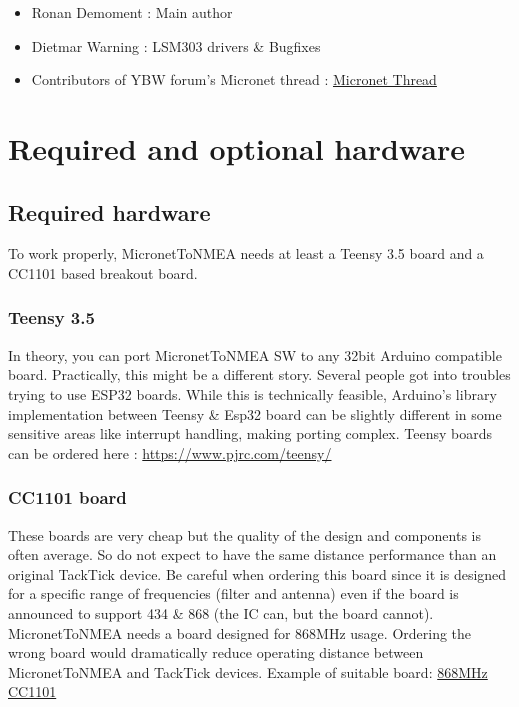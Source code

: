 \documentclass{report}
\begin{document}
\begin{itemize}
\item  Ronan Demoment : Main author
\item Dietmar Warning : LSM303 drivers \& Bugfixes
\item Contributors of YBW forum's Micronet thread : \href{https://forums.ybw.com/index.php?threads/raymarines-micronet.539500/}{Micronet Thread}
\end{itemize}

\chapter{Required and optional hardware}

\section{Required hardware}

To work properly, MicronetToNMEA needs at least a Teensy 3.5 board and a CC1101 based breakout board.

\subsection{Teensy 3.5}
In theory, you can port MicronetToNMEA SW to any 32bit Arduino compatible board. Practically, this might be a different story. Several people got into troubles trying to use ESP32 boards. While this is technically feasible, Arduino's library implementation between Teensy \& Esp32 board can be slightly different in some sensitive areas like interrupt handling, making porting complex.
Teensy boards can be ordered here : \url{https://www.pjrc.com/teensy/}

\subsection{CC1101 board}

These boards are very cheap but the quality of the design and components is often average. So do not expect to have the same distance performance than an original TackTick device. Be careful when ordering this board since it is designed for a specific range of frequencies (filter and antenna) even if the board is announced to support 434 \& 868 (the IC can, but the board cannot). MicronetToNMEA needs a board designed for 868MHz usage. Ordering the wrong board would dramatically reduce operating distance between MicronetToNMEA and TackTick devices. Example of suitable board:
\href{https://www.amazon.fr/laqiya-cc1101-868-MHz-Transmission-Antenne-Transceiver/dp/B075PFQ57G}{868MHz CC1101}
\end{document}
